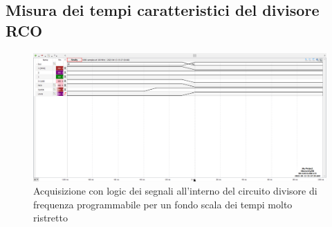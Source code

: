 \documentclass[10pt, a4paper, italian]{article}
\begin{document}
\subsection{Misura dei tempi caratteristici del divisore RCO}
\begin{figure}[htbp]
\centering
	\includegraphics[width=\textwidth]{5.f_0110_20ns}
	\caption{Acquisizione con logic dei segnali all'interno del circuito divisore di frequenza programmabile per un fondo scala dei tempi molto ristretto}
\end{figure}
\end{document}
